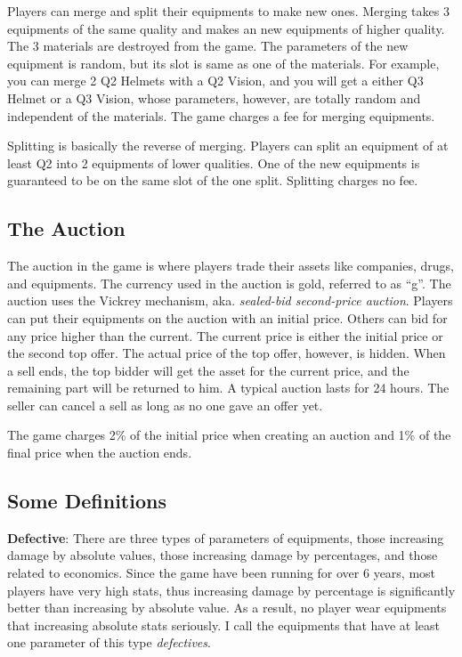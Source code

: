 \documentclass{manuscript}
\begin{document}
    Players can merge and split their equipments to make new ones. Merging takes 3 equipments of the same quality and makes
    an new equipments of higher quality. The 3 materials are destroyed from the game. The parameters of the new equipment
    is random, but its slot is same as one of the materials. For example, you can merge 2 Q2 Helmets with a Q2 Vision,
    and you will get a either Q3 Helmet or a Q3 Vision, whose parameters, however, are totally random and independent of
    the materials. The game charges a fee for merging equipments.

    Splitting is basically the reverse of merging. Players can split an equipment of at least Q2 into 2 equipments of
    lower qualities. One of the new equipments is guaranteed to be on the same slot of the one split. Splitting charges
    no fee.

    \subsection{The Auction}

    The auction in the game is where players trade their assets like companies, drugs, and equipments. The currency used
    in the auction is gold, referred to as ``g''. The auction uses the Vickrey mechanism, aka. \textit{sealed-bid
    second-price auction}. Players can put their equipments on the auction with an initial price. Others can bid for any
    price higher than the current. The current price is either the initial price or the second top offer. The actual price
    of the top offer, however, is hidden. When a sell ends, the top bidder will get the asset for the current price, and
    the remaining part will be returned to him. A typical auction lasts for 24 hours. The seller can cancel a sell as long
    as no one gave an offer yet.

    The game charges 2\% of the initial price when creating an auction and 1\% of the final price when the auction ends.

    \subsection{Some Definitions}

    \textbf{Defective}: There are three types of parameters of equipments, those increasing damage by absolute values,
    those increasing damage by percentages, and those related to economics. Since the game have been running for over 6
    years, most players have very high stats, thus increasing damage by percentage is significantly better than increasing
    by absolute value. As a result, no player wear equipments that increasing absolute stats seriously. I call the equipments
    that have at least one parameter of this type \textit{defectives}.
\end{document}
